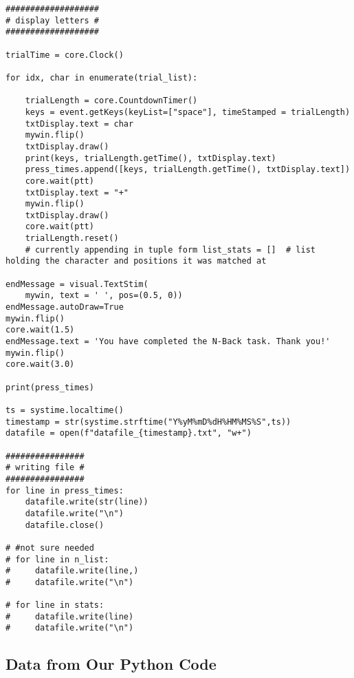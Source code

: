 \documentclass{article}
\begin{document}
\begin{verbatim}
###################
# display letters #
###################

trialTime = core.Clock()

for idx, char in enumerate(trial_list):

    trialLength = core.CountdownTimer()
    keys = event.getKeys(keyList=["space"], timeStamped = trialLength)
    txtDisplay.text = char
    mywin.flip()
    txtDisplay.draw()
    print(keys, trialLength.getTime(), txtDisplay.text)
    press_times.append([keys, trialLength.getTime(), txtDisplay.text])
    core.wait(ptt)
    txtDisplay.text = "+"
    mywin.flip()
    txtDisplay.draw()
    core.wait(ptt)
    trialLength.reset()
    # currently appending in tuple form list_stats = []  # list holding the character and positions it was matched at

endMessage = visual.TextStim(
    mywin, text = ' ', pos=(0.5, 0))
endMessage.autoDraw=True
mywin.flip()
core.wait(1.5)
endMessage.text = 'You have completed the N-Back task. Thank you!'
mywin.flip()
core.wait(3.0)

print(press_times)

ts = systime.localtime()
timestamp = str(systime.strftime("Y%yM%mD%dH%HM%MS%S",ts))
datafile = open(f"datafile_{timestamp}.txt", "w+")

################
# writing file #
################
for line in press_times:
    datafile.write(str(line))
    datafile.write("\n")
    datafile.close()

# #not sure needed
# for line in n_list:
#     datafile.write(line,)
#     datafile.write("\n")

# for line in stats:
#     datafile.write(line)
#     datafile.write("\n")

\end{verbatim}
\subsection{Data from Our Python Code}
\label{sec:org8170de3}
\end{document}
